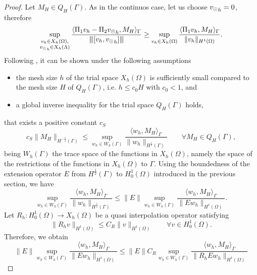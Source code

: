 \begin{proof}
Let $M_H \in Q_H(\Gamma)$. As in the continuos case, let us choose ${v_{\odot}}_h =0$, therefore 
\begin{equation*}
\sup_{\substack{v_h \in X_h(\Omega),\\ {v_{\odot}}_h \in X_h(\Lambda)}} \frac{ \langle \Pi_1 v_h - \Pi_2 {v_{\odot}}_h, M_H \rangle _{\Gamma}} {{\left\vert\kern-0.25ex\left\vert\kern-0.25ex\left\vert [v_h, {v_{\odot}}_h] \right\vert\kern-0.25ex\right\vert\kern-0.25ex\right\vert}}
\geq \sup_{v_h \in X_h(\Omega)} \frac{ \langle \Pi_1 v_h, M_H \rangle _{\Gamma} } {\|v_h\|_{H^1(\Omega)}}.
\end{equation*}
Following \cite[Theorem 11.5]{steinbach2007numerical}, it can be shown under the following assumptions 
\begin{itemize}
\item the mesh size $h$ of the trial space $X_h(\Omega)$ is sufficiently small compared to the mesh size $H$ of $Q_H(\Gamma)$, i.e. $h \leq c_0 H$ with $c_0 < 1$, and
\item a global inverse inequality for the trial space $Q_H(\Gamma)$ holds,
\end{itemize}
that exists a positive constant $c_S$
\begin{equation}\label{infsup_tracespace}
c_S \|M_H\|_{H^{-\frac 12}(\Gamma)} \leq 
\sup_{w_h \in W_h(\Gamma)} \frac{ \langle w_h, M_H \rangle _{\Gamma} } {\|w_h\|_{H^{\frac 12}(\Gamma)}} \qquad \forall M_H \in Q_H(\Gamma),
\end{equation}
being $W_h(\Gamma)$ the trace space of the functions in $X_h(\Omega)$, namely the space of the restrictions of the functions in $X_h(\Omega)$ to $\Gamma$. 
Using the boundedness of the extension operator $E$ from $H^{\frac 12}(\Gamma)$ to $H^1_0(\Omega)$ introduced in the previous section, we have
\begin{equation*}
\sup_{w_h \in W_h(\Gamma)} \frac{ \langle w_h, M_H \rangle _{\Gamma} } {\|w_h\|_{H^{\frac 12}(\Gamma)}} 
\leq 
\|E\| \sup_{w_h \in W_h(\Gamma)} \frac{ \langle w_h, M_H \rangle _{\Gamma} } {\|E w_h\|_{H^1(\Omega)}}.
\end{equation*}
Let $R_h: H^1_0(\Omega) \rightarrow X_h(\Omega)$ be a quasi interpolation operator satisfying 
\begin{equation*}
\|R_h v\|_{H^1(\Omega)} \leq C_R \|v\|_{H^1(\Omega)} \qquad \forall v \in H^1_0(\Omega).
\end{equation*}
Therefore, we obtain 
\begin{equation*}
\|E\| \sup_{w_h \in W_h(\Gamma)} \frac{ \langle w_h, M_H \rangle _{\Gamma} } {\|E w_h\|_{H^1(\Omega)}}
\leq
\|E\| C_R \sup_{w_h \in W_h(\Gamma)} \frac{ \langle w_h, M_H \rangle_{\Gamma} } {\|R_hE w_h\|_{H^1(\Omega)}}

\end{equation*}
\end{proof}
